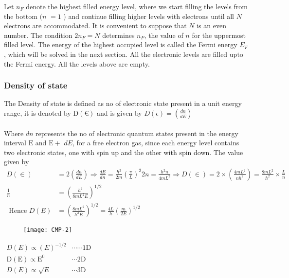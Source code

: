 Let $n_{F}$ denote the highest filled energy level, where we start filling the levels from the bottom $(n$ $=1$ ) and continue filling higher levels with electrons until all $N$ electrons are accommodated. It is convenient to suppose that $N$ is an even number. The condition $2 n_{F}=N$ determines $n_{F}$, the value of $n$ for the uppermost filled level. The energy of the highest occupied level is called the Fermi energy $E_{F}$, which will be solved in the next section. All the electronic levels are filled upto the Fermi energy. All the levels above are empty.
\subsubsection{Density of state}
 The Density of state is defined as no of electronic state present in a unit energy range, it is denoted by $\mathrm{D}(€)$ and is given by $D(\epsilon)=\left(\frac{d n}{d E}\right)$\\\\
Where $d n$ represents the no of electronic quantum states present in the energy interval $\mathrm{E}$ and $\mathrm{E}+$ $d E$, for a free electron gas, since each energy level contains two electronic states, one with spin up and the other with spin down. The value given by
\begin{align*}
D(\in)&=2\left(\frac{d n}{d E}\right) \Rightarrow \frac{d E}{d n}=\frac{\hbar^{2}}{2 m}\left(\frac{\pi}{L}\right)^{2} 2 n=\frac{h^{2} n}{4 m L^{2}} \Rightarrow D(\in)=2 \times\left(\frac{4 m L^{2}}{n h^{2}}\right)=\frac{8 m L^{2}}{h^{2}} \times \frac{L}{n}\\
\frac{1}{n}&=\left(\frac{h^{2}}{8 m L^{2} E}\right)^{1 / 2}\\
\text { Hence } D(E)&=\left(\frac{8 m L^{2}}{h^{2} E}\right)^{1 / 2}=\frac{4 L}{h}\left(\frac{m}{2 E}\right)^{1 / 2}
\end{align*}
\begin{figure}[H]
	\centering
	\texttt{[image: CMP-2]}
\end{figure}
\begin{note}
	$\begin{array}{lr}D(E) \propto(E)^{-1 / 2} & \cdots \cdots 1 \mathrm{D} \\ \mathrm{D}(\mathrm{E}) \propto \mathrm{E}^{0} & \cdots2 \mathrm{D} \\ D(E) \propto \sqrt{E} & \cdots3 \mathrm{D}\end{array}$
\end{note}
